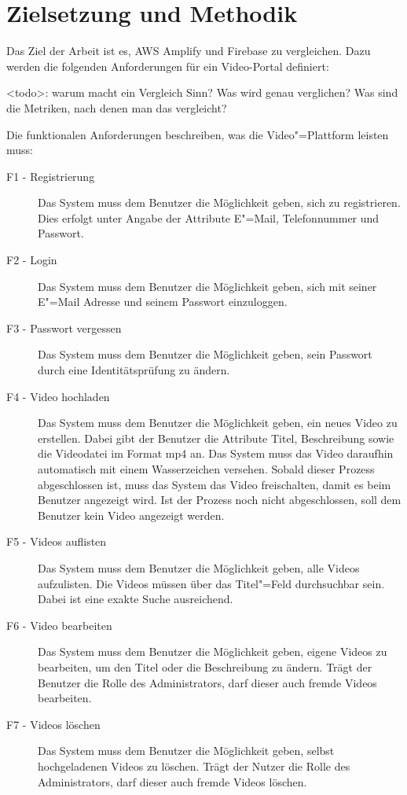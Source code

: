 \section{Zielsetzung und Methodik}

Das Ziel der Arbeit ist es, AWS Amplify und Firebase zu vergleichen. Dazu werden die folgenden Anforderungen für ein Video-Portal definiert:

<todo>: warum macht ein Vergleich Sinn? Was wird genau verglichen? Was sind die Metriken, nach denen man das vergleicht?

Die funktionalen Anforderungen beschreiben, was die Video"=Plattform leisten muss:
\begin{description}
   \item[F1 - Registrierung] Das System muss dem Benutzer die Möglichkeit geben, sich zu registrieren. Dies erfolgt unter Angabe der Attribute E"=Mail, Telefonnummer und Passwort. \label{F1}
   \item[F2 - Login] Das System muss dem Benutzer die Möglichkeit geben, sich mit seiner E"=Mail Adresse und seinem Passwort einzuloggen. \label{F2}
   \item[F3 - Passwort vergessen] Das System muss dem Benutzer die Möglichkeit geben, sein Passwort durch eine Identitätsprüfung zu ändern. \label{F3}
   \item[F4 - Video hochladen] Das System muss dem Benutzer die Möglichkeit geben, ein neues Video zu erstellen. Dabei gibt der Benutzer die Attribute Titel, Beschreibung sowie die Videodatei im Format mp4 an. Das System muss das Video daraufhin automatisch mit einem Wasserzeichen versehen. Sobald dieser Prozess abgeschlossen ist, muss das System das Video freischalten, damit es beim Benutzer angezeigt wird. Ist der Prozess noch nicht abgeschlossen, soll dem Benutzer kein Video angezeigt werden. \label{F4}
   \item[F5 - Videos auflisten] Das System muss dem Benutzer die Möglichkeit geben, alle Videos aufzulisten. Die Videos müssen über das Titel"=Feld durchsuchbar sein. Dabei ist eine exakte Suche ausreichend. \label{F5}
   \item[F6 - Video bearbeiten] Das System muss dem Benutzer die Möglichkeit geben, eigene Videos zu bearbeiten, um den Titel oder die Beschreibung zu ändern. Trägt der Benutzer die Rolle des Administrators, darf dieser auch fremde Videos bearbeiten. \label{F6}
   \item[F7 - Videos löschen] Das System muss dem Benutzer die Möglichkeit geben, selbst hochgeladenen Videos zu löschen. Trägt der Nutzer die Rolle des Administrators, darf dieser auch fremde Videos löschen. \label{F7}
\end{description}

